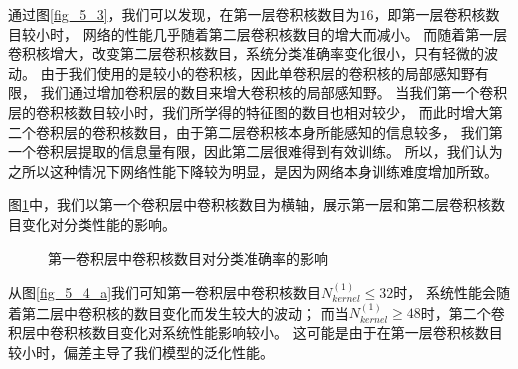通过图\ref{fig_5_3}，我们可以发现，在第一层卷积核数目为$16$，即第一层卷积核数目较小时，
网络的性能几乎随着第二层卷积核数目的增大而减小。
而随着第一层卷积核增大，改变第二层卷积核数目，系统分类准确率变化很小，只有轻微的波动。
由于我们使用的是较小的卷积核，因此单卷积层的卷积核的局部感知野有限，
我们通过增加卷积层的数目来增大卷积核的局部感知野。
当我们第一个卷积层的卷积核数目较小时，我们所学得的特征图的数目也相对较少，
而此时增大第二个卷积层的卷积核数目，由于第二层卷积核本身所能感知的信息较多，
我们第一个卷积层提取的信息量有限，因此第二层很难得到有效训练。
所以，我们认为之所以这种情况下网络性能下降较为明显，是因为网络本身训练难度增加所致。\par

图\ref{fig_5_4}中，我们以第一个卷积层中卷积核数目为横轴，展示第一层和第二层卷积核数目变化对分类性能的影响。\par
\begin{figure}[!h]
	\centering
	\caption{第一卷积层中卷积核数目对分类准确率的影响}
	\label{fig_5_4}
\end{figure}
从图\ref{fig_5_4_a}我们可知第一卷积层中卷积核数目$N_{kernel}^{(1)} \leq 32$时，
系统性能会随着第二层中卷积核的数目变化而发生较大的波动；
而当$N_{kernel}^{(1)} \geq 48$时，第二个卷积层中卷积核数目变化对系统性能影响较小。
这可能是由于在第一层卷积核数目较小时，偏差主导了我们模型的泛化性能。\par

